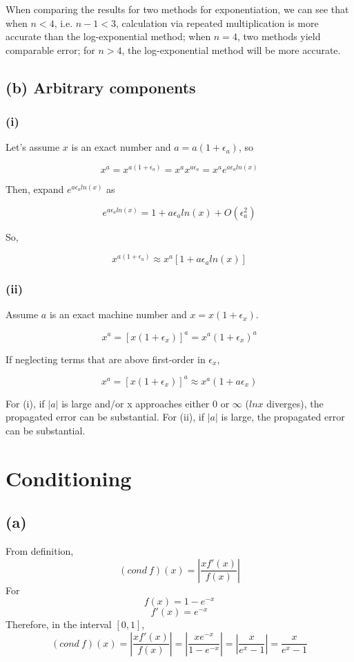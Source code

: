 \documentclass[a4paper, 12pt]{article}
\begin{document}
When comparing the results for two methods for exponentiation, we can see that when $n<4$, i.e. $n-1<3$, calculation via repeated multiplication is more accurate than the log-exponential method; when $n=4$, two methods yield comparable error; for $n>4$, the log-exponential method will be more accurate.

\subsection*{(b) Arbitrary components}

\subsubsection*{(i)}
Let's assume $x$ is an exact number and $a = a(1+\epsilon _a)$, so

\[x^a = x^{a(1+\epsilon _a)} = x^a x^{a\epsilon_a} = x^a e^{a\epsilon_a ln(x)}\]

Then, expand $e^{a\epsilon_a ln(x)}$ as

\[e^{a\epsilon_a ln(x)} = 1+ a\epsilon_a ln(x) +O(\epsilon_a ^2)\]

So,

\[x^{a(1+\epsilon _a)} \approx x^a[1+a\epsilon_a ln(x)]\]

\subsubsection*{(ii)}

Assume $a$ is an exact machine number and $x = x(1+\epsilon_x)$.

\[x^a = [x(1+\epsilon _x)]^a = x^a (1+\epsilon_x)^a\]

If neglecting terms that are above first-order in $\epsilon _x$,

\[x^a = [x(1+\epsilon _x)]^a \approx x^a (1+a\epsilon_x)\]

For (i), if $|a|$ is large and/or x approaches either $0$ or $\infty$ ($lnx$ diverges), the propagated error can be substantial. For (ii), if $|a|$ is large, the propagated error can be substantial.

\section{Conditioning}

\subsection*{(a)}
From definition,
\[(cond\ f)(x) = | \frac{xf'(x)}{f(x)} |\]
For
\[f(x)=1-e^{-x}\]
\[f'(x) = e^{-x}\]
Therefore, in the interval $[0,1]$,
\[(cond\ f)(x) = | \frac{xf'(x)}{f(x)} | = |\frac{xe^{-x}}{1-e^{-x}}| = |\frac{x}{e^x-1}| = \frac{x}{e^x-1}\]
\end{document}
